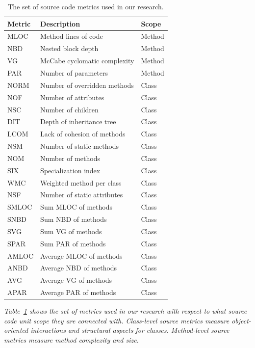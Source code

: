 \begin{table}[h]
  \centering
  \begin{tabular}{|l|l|l|}
    \hline
    \rowcolor[RGB]{169,196,223}
    \textbf{Metric} & \textbf{Description} & \textbf{Scope} \\
    \hline MLOC & Method lines of code & Method \\
    \hline NBD & Nested block depth & Method \\
    \hline VG & McCabe cyclomatic complexity & Method \\
    \hline PAR & Number of parameters & Method \\
    \hline NORM & Number of overridden methods & Class \\
    \hline NOF & Number of attributes & Class \\
    \hline NSC & Number of children & Class \\
    \hline DIT & Depth of inheritance tree & Class \\
    \hline LCOM & Lack of cohesion of methods & Class \\
    \hline NSM & Number of static methods & Class \\
    \hline NOM & Number of methods & Class \\
    \hline SIX & Specialization index & Class \\
    \hline WMC & Weighted method per class & Class \\
    \hline NSF & Number of static attributes & Class \\
    \hline SMLOC & Sum MLOC of methods & Class \\
    \hline SNBD & Sum NBD of methods & Class \\
    \hline SVG & Sum VG of methods & Class \\
    \hline SPAR & Sum PAR of methods & Class \\
    \hline AMLOC & Average MLOC of methods & Class \\
    \hline ANBD & Average NBD of methods & Class \\
    \hline AVG & Average VG of methods & Class \\
    \hline APAR & Average PAR of methods & Class \\
    \hline
  \end{tabular}
  \caption{The set of source code metrics used in our research.}
  \vspace{1mm}
  \footnotesize{\emph{Table~\ref{tab:source_metrics} shows the set of metrics used in our research with respect to what source code unit scope they are connected with. Class-level source metrics measure object-oriented interactions and structural aspects for classes. Method-level source metrics measure method complexity and size.}}
  \vspace{1mm}
  \label{tab:source_metrics}
\end{table}


